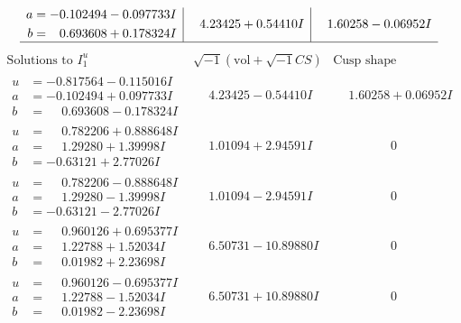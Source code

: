 \documentclass[1p]{elsarticle_modified}
\theoremstyle{definition}
\newcommand{\I}{\sqrt{-1}}
\begin{document}
$$\begin{array}{c|c|c}
\begin{aligned}
a &= -0.102494 - 0.097733 I \\
b &= \phantom{-}0.693608 + 0.178324 I\end{aligned}
 & \phantom{-}4.23425 + 0.54410 I & \phantom{-}1.60258 - 0.06952 I\\
 \hline 
 \end{array}$$\newpage$$\begin{array}{c|c|c}  
\text{Solutions to }I^u_{1}& \I (\text{vol} + \sqrt{-1}CS) & \text{Cusp shape}\\
 \hline 
\begin{aligned}
u &= -0.817564 - 0.115016 I \\
a &= -0.102494 + 0.097733 I \\
b &= \phantom{-}0.693608 - 0.178324 I\end{aligned}
 & \phantom{-}4.23425 - 0.54410 I & \phantom{-}1.60258 + 0.06952 I \\ \hline\begin{aligned}
u &= \phantom{-}0.782206 + 0.888648 I \\
a &= \phantom{-}1.29280 + 1.39998 I \\
b &= -0.63121 + 2.77026 I\end{aligned}
 & \phantom{-}1.01094 + 2.94591 I & \phantom{-0.000000 } 0 \\ \hline\begin{aligned}
u &= \phantom{-}0.782206 - 0.888648 I \\
a &= \phantom{-}1.29280 - 1.39998 I \\
b &= -0.63121 - 2.77026 I\end{aligned}
 & \phantom{-}1.01094 - 2.94591 I & \phantom{-0.000000 } 0 \\ \hline\begin{aligned}
u &= \phantom{-}0.960126 + 0.695377 I \\
a &= \phantom{-}1.22788 + 1.52034 I \\
b &= \phantom{-}0.01982 + 2.23698 I\end{aligned}
 & \phantom{-}6.50731 - 10.89880 I & \phantom{-0.000000 } 0 \\ \hline\begin{aligned}
u &= \phantom{-}0.960126 - 0.695377 I \\
a &= \phantom{-}1.22788 - 1.52034 I \\
b &= \phantom{-}0.01982 - 2.23698 I\end{aligned}
 & \phantom{-}6.50731 + 10.89880 I & \phantom{-0.000000 } 0 \\ \hline\begin{aligned}

\end{aligned}
\end{array}$$
\end{document}
